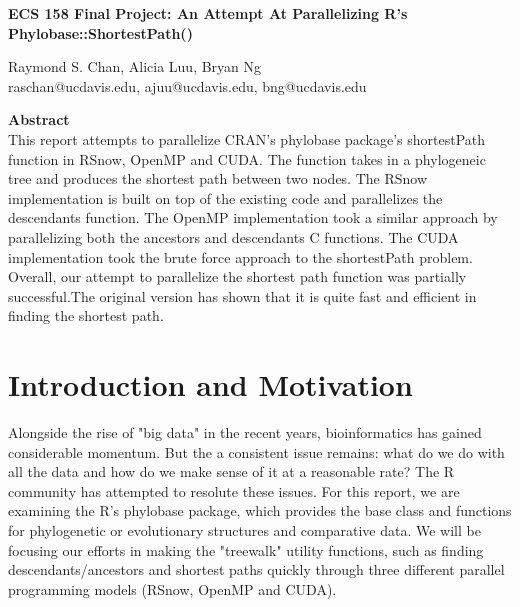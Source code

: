 \documentclass[11pt,letterpaper]{article}
\begin{document}
\begin{center}
{\huge \textbf{ECS 158 Final Project: An Attempt At Parallelizing R's Phylobase::ShortestPath()}\\
\vspace{5mm}
\begin{Large}
Raymond S. Chan, Alicia Luu, Bryan Ng\\
raschan@ucdavis.edu, ajuu@ucdavis.edu, bng@ucdavis.edu\\
\end{Large}}
\end{center}


\vspace{5mm}

\begin{center}
	\begin{large}
		\textbf{Abstract}\\
This report attempts to parallelize CRAN's phylobase package's shortestPath function in RSnow, OpenMP and CUDA. The function takes in a phylogeneic tree and produces the shortest path between two nodes. The RSnow implementation is built on top of the existing code and parallelizes the descendants function. The OpenMP implementation took a similar approach by parallelizing both the ancestors and descendants C functions. The CUDA implementation took the brute force approach to the shortestPath problem. Overall, our attempt to parallelize the shortest path function was partially successful.The original version has shown that it is quite fast and efficient in finding the shortest path. \\
	\end{large}
\end{center}

\section{Introduction and Motivation}
 
Alongside the rise of "big data" in the recent years, bioinformatics has gained considerable momentum. But the a consistent issue remains: what do we do with all the data and how do we make sense of it at a reasonable rate? The R community has attempted to resolute these issues. For this report, we are examining the R's phylobase package, which provides the base class and functions for phylogenetic or evolutionary structures and comparative data. We will be focusing our efforts in making the "treewalk" utility functions, such as finding descendants/ancestors and shortest paths quickly through three different parallel programming models (RSnow, OpenMP and CUDA).  
\end{document}
